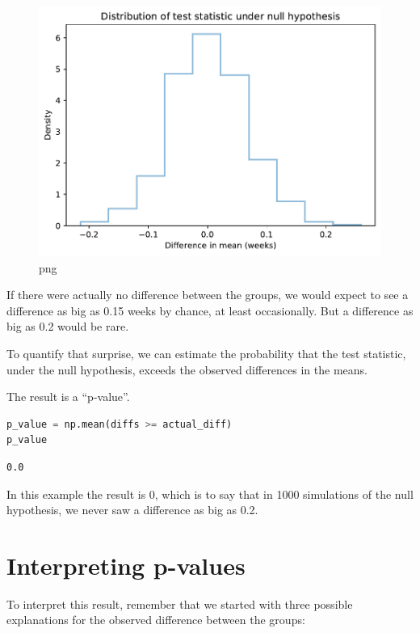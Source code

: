 \begin{figure}
\centering
\includegraphics{11_inference_files/11_inference_79_0.pdf}
\caption{png}
\end{figure}

If there were actually no difference between the groups, we would expect
to see a difference as big as 0.15 weeks by chance, at least
occasionally. But a difference as big as 0.2 would be rare.

To quantify that surprise, we can estimate the probability that the test
statistic, under the null hypothesis, exceeds the observed differences
in the means.

The result is a ``p-value''.

\begin{lstlisting}[language=Python]
p_value = np.mean(diffs >= actual_diff)
p_value
\end{lstlisting}

\begin{lstlisting}[]
0.0
\end{lstlisting}

In this example the result is 0, which is to say that in 1000
simulations of the null hypothesis, we never saw a difference as big as
0.2.

\hypertarget{interpreting-p-values}{%
\section{Interpreting p-values}\label{interpreting-p-values}}

To interpret this result, remember that we started with three possible
explanations for the observed difference between the groups:

